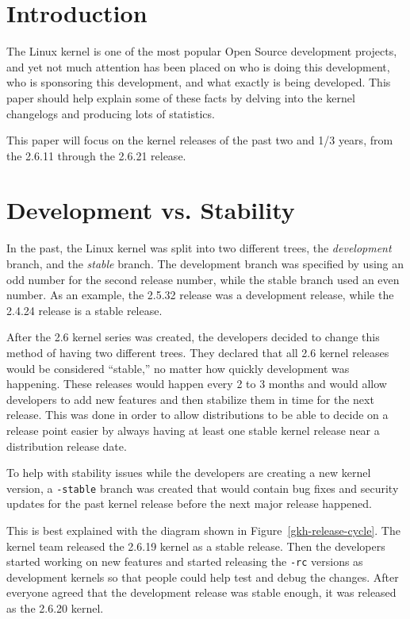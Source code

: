 \documentclass[final]{ols}
\begin{document}

\section{Introduction}
The Linux kernel is one of the most popular Open Source development
projects, and yet not much attention has been placed on who is doing
this development, who is sponsoring this development, and what exactly
is being developed.  This paper should help explain some of these facts
by delving into the kernel changelogs and producing lots of statistics.

This paper will focus on the kernel releases of the past two and 1/3
years, from the 2.6.11 through the 2.6.21 release.

\section{Development vs. Stability}
In the past, the Linux kernel was split into two different trees, the
\textit{development} branch, and the \textit{stable} branch.  The development branch
was specified by using an odd number for the second release number, while
the stable branch used an even number.  As an example, the 2.5.32
release was a development release, while the 2.4.24 release is a stable
release.

After the 2.6 kernel series was created, the developers decided to
change this method of having two different trees.  They declared that
all 2.6 kernel releases would be considered ``stable,'' no matter how
quickly development was happening.  These releases would happen every 2
to 3 months and would allow developers to add new features and then
stabilize them in time for the next release.  This was done in order to
allow distributions to be able to decide on a release point easier by
always having at least one stable kernel release near a distribution
release date.

To help with stability issues while the developers are creating a new
kernel version, a \texttt{-stable} branch was created that would contain bug
fixes and security updates for the past kernel release before the next
major release happened.

This is best explained with the diagram shown in Figure~\ref{gkh-release-cycle}.
The kernel team
released the 2.6.19 kernel as a stable release.  Then the developers
started working on new features and started releasing the \texttt{-rc} versions
as development kernels so that people could help test and debug the
changes.  After everyone agreed that the development release was stable
enough, it was released as the 2.6.20 kernel.
\end{document}
